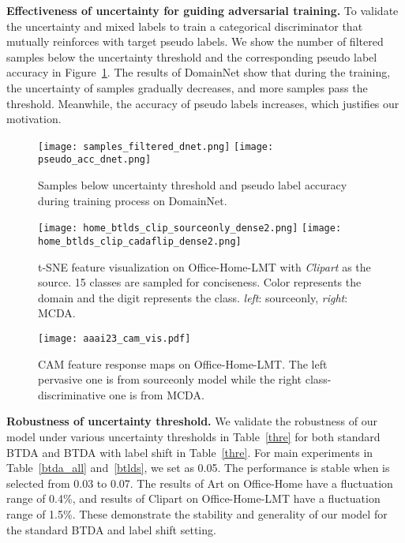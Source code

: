 \documentclass[letterpaper]{article} \usepackage{aaai23}  \usepackage{times}  \usepackage{helvet}  \usepackage{courier}  \usepackage[hyphens]{url}  \usepackage{graphicx} \urlstyle{rm} \def\UrlFont{\rm}  \usepackage{natbib}  \usepackage{caption} \frenchspacing  \setlength{\pdfpagewidth}{8.5in}  \setlength{\pdfpageheight}{11in}
\begin{document}
\noindent\textbf{Effectiveness of uncertainty for guiding adversarial training.} To validate the uncertainty and mixed labels to train a categorical discriminator  that mutually reinforces with target pseudo labels. We show the number of filtered samples below the uncertainty threshold and the corresponding pseudo label accuracy in Figure~\ref{pse_acc}. The results of DomainNet show that during the training, the uncertainty of samples gradually decreases, and more samples pass the threshold. Meanwhile, the accuracy of pseudo labels increases, which justifies our motivation.



\begin{figure}[t]
\centering
    \label{fig:subfig:sourceonly_tsne} 
    \texttt{[image: samples\_filtered\_dnet.png]}
    \label{fig:subfig:mcda_tsne} 
    \texttt{[image: pseudo\_acc\_dnet.png]}
    

\caption{Samples below uncertainty threshold and pseudo label accuracy during training process on DomainNet.} 
\label{pse_acc}
\end{figure}



\begin{figure}[t]
\centering

\label{fig:subfig:onefunction} 
\texttt{[image: home\_btlds\_clip\_sourceonly\_dense2.png]}
\label{fig:subfig:twofunction} 
\texttt{[image: home\_btlds\_clip\_cadaflip\_dense2.png]}


\caption{t-SNE feature visualization on Office-Home-LMT with \textit{Clipart} as the source. 15 classes are sampled for conciseness. Color represents the domain and the digit represents the class. \textit{left}: sourceonly, \textit{right}: MCDA.} 
\label{t-sne}
\end{figure}




\begin{figure}[t]
\centering

\texttt{[image: aaai23\_cam\_vis.pdf]}

\caption{CAM feature response maps on Office-Home-LMT. The left pervasive one is from sourceonly model while the right class-discriminative one is from MCDA.}
\label{cam} 
\end{figure}






\noindent\textbf{Robustness of uncertainty threshold.} We validate the robustness of our model under various uncertainty thresholds  in Table~\ref{thre} for both standard BTDA and BTDA with label shift in Table~\ref{thre}. For main experiments in Table~\ref{btda_all} and~\ref{btlds}, we set  as 0.05. The performance is stable when  is selected from 0.03 to 0.07. The results of Art on Office-Home have a fluctuation range of 0.4\%, and results of Clipart on Office-Home-LMT have a fluctuation range of 1.5\%. These demonstrate the stability and generality of our model for the standard BTDA and label shift setting.
\end{document}
